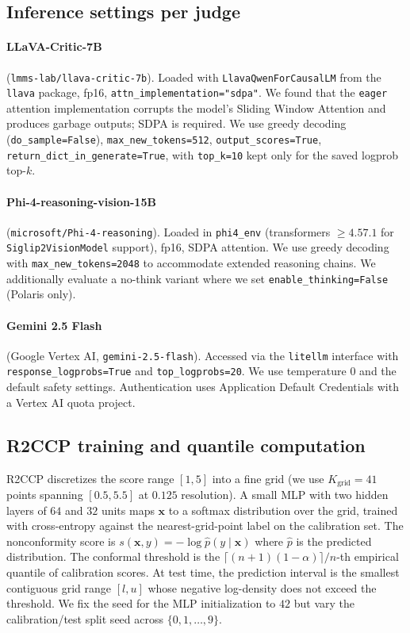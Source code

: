 \documentclass{article}
\begin{document}
\subsection{Inference settings per judge}
\label{app:judge_settings}

\paragraph{LLaVA-Critic-7B} (\texttt{lmms-lab/llava-critic-7b}). Loaded with \texttt{LlavaQwenForCausalLM} from the \texttt{llava} package, fp16, \texttt{attn\_implementation="sdpa"}. We found that the \texttt{eager} attention implementation corrupts the model's Sliding Window Attention and produces garbage outputs; SDPA is required. We use greedy decoding (\texttt{do\_sample=False}), \texttt{max\_new\_tokens=512}, \texttt{output\_scores=True}, \texttt{return\_dict\_in\_generate=True}, with \texttt{top\_k=10} kept only for the saved logprob top-$k$.

\paragraph{Phi-4-reasoning-vision-15B} (\texttt{microsoft/Phi-4-reasoning}). Loaded in \texttt{phi4\_env} (transformers $\geq 4.57.1$ for \texttt{Siglip2VisionModel} support), fp16, SDPA attention. We use greedy decoding with \texttt{max\_new\_tokens=2048} to accommodate extended reasoning chains. We additionally evaluate a no-think variant where we set \texttt{enable\_thinking=False} (Polaris only).

\paragraph{Gemini 2.5 Flash} (Google Vertex AI, \texttt{gemini-2.5-flash}). Accessed via the \texttt{litellm} interface with \texttt{response\_logprobs=True} and \texttt{top\_logprobs=20}. We use temperature $0$ and the default safety settings. Authentication uses Application Default Credentials with a Vertex AI quota project.

\subsection{R2CCP training and quantile computation}
\label{app:r2ccp_train}

R2CCP discretizes the score range $[1, 5]$ into a fine grid (we use $K_{\text{grid}} = 41$ points spanning $[0.5, 5.5]$ at $0.125$ resolution). A small MLP with two hidden layers of $64$ and $32$ units maps $\mathbf{x}$ to a softmax distribution over the grid, trained with cross-entropy against the nearest-grid-point label on the calibration set. The nonconformity score is $s(\mathbf{x}, y) = -\log \hat{p}(y \mid \mathbf{x})$ where $\hat{p}$ is the predicted distribution. The conformal threshold is the $\lceil (n+1)(1-\alpha) \rceil / n$-th empirical quantile of calibration scores. At test time, the prediction interval is the smallest contiguous grid range $[l, u]$ whose negative log-density does not exceed the threshold. We fix the seed for the MLP initialization to $42$ but vary the calibration/test split seed across $\{0, 1, \dots, 9\}$.
\end{document}
